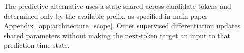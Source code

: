 \documentclass[twoside,11pt]{article}
\begin{document}
The predictive alternative uses a state shared across candidate tokens and determined only by the available prefix, as specified in main-paper Appendix~\ref{app:architecture_scope}. Outer supervised differentiation updates shared parameters without making the next-token target an input to that prediction-time state.


\end{document}
